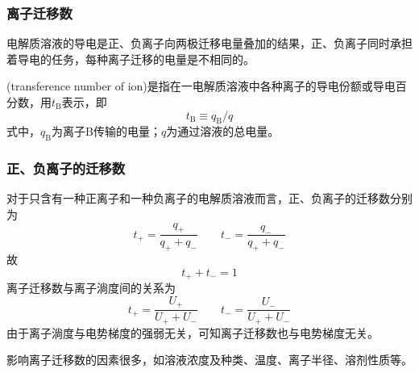 \documentclass[dvipsnames, svgnames, x11names]{beamer}
\begin{document}
	
	\begin{frame}
		\frametitle{离子迁移数}
	
		\large 电解质溶液的导电是正、负离子向两极迁移电量叠加的结果，正、负离子同时承担着导电的任务，每种离子迁移的电量是不相同的。
	
		(transference number of ion)是指在一电解质溶液中各种离子的导电份额或导电百分数，用$t_\mathrm{B}$表示，即
		\[
			t_\mathrm{B}\equiv q_\mathrm{B}/q
		\]
		式中，$q_\mathrm{B}$为离子B传输的电量；$q$为通过溶液的总电量。
	
	\end{frame}
	
	
	\begin{frame}
		\frametitle{正、负离子的迁移数}
	
		对于只含有一种正离子和一种负离子的电解质溶液而言，正、负离子的迁移数分别为
		\[
			t_{+}=\frac{q_{+}}{q_{+}+q_{-}} \qquad t_{-}=\frac{q_{-}}{q_{+}+q_{-}}
		\]
		故
		\[
			t_{+}+t_{-}=1
		\]
		离子迁移数与离子淌度间的关系为
		\[
			t_{+}=\frac{U_{+}}{U_{+}+U_{-}} \qquad t_{-}=\frac{U_{-}}{U_{+}+U_{-}}
		\]
		由于离子淌度与电势梯度的强弱无关，可知离子迁移数也与电势梯度无关。
	
		影响离子迁移数的因素很多，如溶液浓度及种类、温度、离子半径、溶剂性质等。
	
	\end{frame}
	
\end{document}
